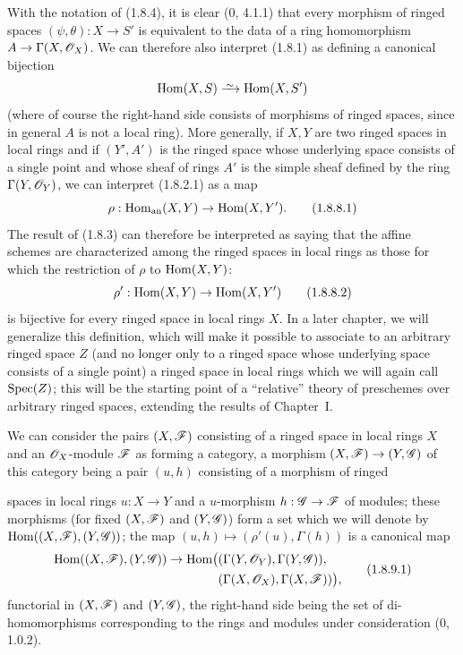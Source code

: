 \begin{env}[1.8.8]
\label{ega2:addendum:I.1.8.8}
With the notation of (1.8.4), it is clear (0, 4.1.1) that every
morphism of ringed spaces $(\psi,\theta):X\to S'$ is equivalent to the
data of a ring homomorphism
$A\to\Gamma(X,\mathscr{O}_X)$. We can therefore also interpret (1.8.1)
as defining a canonical bijection
\[
  \Hom(X,S)\isoto\Hom(X,S')
\]
(where of course the right-hand side consists of morphisms of ringed
spaces, since in general $A$ is not a local ring). More
generally, if $X,Y$ are two ringed spaces in local rings and
if $(Y',A')$ is the ringed space whose underlying space consists of a
single point and whose sheaf of rings $A'$ is the simple sheaf
defined by the ring $\Gamma(Y,\mathscr{O}_Y)$, we can interpret
(1.8.2.1) as a map
\begin{equation}
\label{ega2:addendum:I.1.8.8.1}
  \rho:\operatorname{Hom}_{\mathrm{an}}(X,Y)\to\operatorname{Hom}(X,Y').
\tag{1.8.8.1}
\end{equation}
The result of (1.8.3) can therefore be interpreted as saying that the affine
schemes are characterized among the ringed spaces in local rings
as those for which the restriction of $\rho$ to $\operatorname{Hom}(X,Y)$:
\begin{equation}
\label{ega2:addendum:I.1.8.8.2}
  \rho':\operatorname{Hom}(X,Y)\to\operatorname{Hom}(X,Y')
\tag{1.8.8.2}
\end{equation}
is bijective for every ringed space in local rings $X$. In a
later chapter, we will generalize this definition, which will
make it possible to associate to an arbitrary ringed space $Z$ (and no longer
only to a ringed space whose underlying space consists of a single
point) a ringed space in local rings which we will again call
$\operatorname{Spec}(Z)$; this will be the starting point of a ``relative'' theory of
preschemes over arbitrary ringed spaces, extending the
results of Chapter~I.
\end{env}

\begin{env}[1.8.9]
\label{ega2:addendum:I.1.8.9}
We can consider the pairs $(X,\mathscr{F})$ consisting of a ringed space
in local rings $X$ and an $\mathscr{O}_X$-module $\mathscr{F}$ as forming
a category, a morphism $(X,\mathscr{F})\to(Y,\mathscr{G})$ of this category
being a pair $(u,h)$ consisting of a morphism of ringed
spaces in local rings $u:X\to Y$ and a $u$-morphism
$h:\mathscr{G}\to\mathscr{F}$ of modules; these
morphisms (for fixed $(X,\mathscr{F})$ and $(Y,\mathscr{G})$) form a set
which we will denote by $\operatorname{Hom}((X,\mathscr{F}),(Y,\mathscr{G}))$; the map
$(u,h)\mapsto(\rho'(u),\Gamma(h))$ is a canonical map
\begin{equation}
\label{ega2:addendum:I.1.8.9.1}
\begin{split}
  \operatorname{Hom}((X,\mathscr{F}),(Y,\mathscr{G}))\to
  \operatorname{Hom}\bigl(
    &(\Gamma(Y,\mathscr{O}_Y),\Gamma(Y,\mathscr{G})),\\
    &(\Gamma(X,\mathscr{O}_X),\Gamma(X,\mathscr{F}))
  \bigr),
\end{split}
\tag{1.8.9.1}
\end{equation}
functorial in $(X,\mathscr{F})$ and $(Y,\mathscr{G})$, the right-hand side being
the set of di-homomorphisms corresponding to the rings and
modules under consideration (0, 1.0.2).
\end{env}

